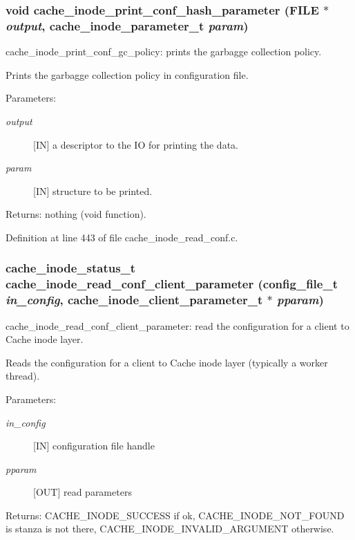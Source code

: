 \subsubsection{\setlength{\rightskip}{0pt plus 5cm}void cache\_\-inode\_\-print\_\-conf\_\-hash\_\-parameter (FILE $\ast$ {\em output}, cache\_\-inode\_\-parameter\_\-t {\em param})}\label{cache__inode__read__conf_8c_a3}


cache\_\-inode\_\-print\_\-conf\_\-gc\_\-policy: prints the garbagge collection policy.

Prints the garbagge collection policy in configuration file.

\begin{Desc}
\item[Parameters:]
\begin{description}
\item[{\em output}][IN] a descriptor to the IO for printing the data. \item[{\em param}][IN] structure to be printed.\end{description}
\end{Desc}
\begin{Desc}
\item[Returns:]nothing (void function). \end{Desc}


Definition at line 443 of file cache\_\-inode\_\-read\_\-conf.c.
\subsubsection{\setlength{\rightskip}{0pt plus 5cm}cache\_\-inode\_\-status\_\-t cache\_\-inode\_\-read\_\-conf\_\-client\_\-parameter (config\_\-file\_\-t {\em in\_\-config}, cache\_\-inode\_\-client\_\-parameter\_\-t $\ast$ {\em pparam})}\label{cache__inode__read__conf_8c_a1}


cache\_\-inode\_\-read\_\-conf\_\-client\_\-parameter: read the configuration for a client to Cache inode layer.

Reads the configuration for a client to Cache inode layer (typically a worker thread).

\begin{Desc}
\item[Parameters:]
\begin{description}
\item[{\em in\_\-config}][IN] configuration file handle \item[{\em pparam}][OUT] read parameters\end{description}
\end{Desc}
\begin{Desc}
\item[Returns:]CACHE\_\-INODE\_\-SUCCESS if ok, CACHE\_\-INODE\_\-NOT\_\-FOUND is stanza is not there, CACHE\_\-INODE\_\-INVALID\_\-ARGUMENT otherwise. \end{Desc}


